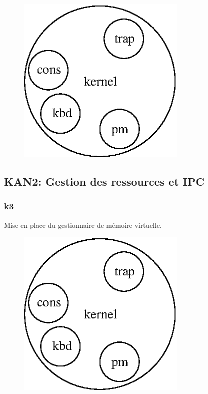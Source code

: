 \documentclass[10pt,a4wide]{article}
\begin{document}
\vspace{5cm}

\begin{figure}[h]
\centerline{\includegraphics{figures/k2.eps}}
\end{figure}

\newpage

\subsection{KAN2: Gestion des ressources et IPC}

\subsubsection{k3}

Mise en place du gestionnaire de m\'emoire virtuelle.

\vspace{5cm}

\begin{figure}[h]
\centerline{\includegraphics{figures/k3.eps}}
\end{figure}
\end{document}

